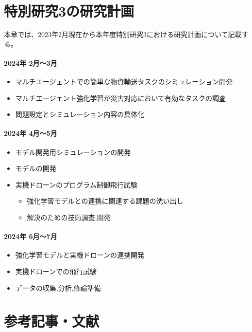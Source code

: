 \documentclass{article}[jsarticle]
\begin{document}
\section{特別研究3の研究計画}
本章では、2023年2月現在から本年度特別研究3における研究計画について記載する。
\paragraph{2024年 2月～3月}
\begin{itemize}
    \item マルチエージェントでの簡単な物資輸送タスクのシミュレーション開発
    \item マルチエージェント強化学習が災害対応において有効なタスクの調査
    \item 問題設定とシミュレーション内容の具体化
\end{itemize}
\paragraph{2024年 4月～5月}
\begin{itemize}
    \item モデル開発用シミュレーションの開発
    \item モデルの開発
    \item 実機ドローンのプログラム制御飛行試験
    \begin{itemize}
        \item 強化学習モデルとの連携に関連する課題の洗い出し
        \item 解決のための技術調査,開発
    \end{itemize}
\end{itemize}
\paragraph{2024年 6月～7月}
\begin{itemize}
    \item 強化学習モデルと実機ドローンの連携開発
    \item 実機ドローンでの飛行試験
    \item データの収集,分析,修論準備
\end{itemize}
\appendix

\section{参考記事・文献}
\end{document}
